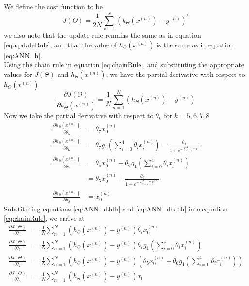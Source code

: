 \documentclass [11pt]{article}
\begin{document}
\subsection{}
We define the cost function to be
\begin{equation}\label{eq:ANN_costFunction}
J(\Theta) = \frac{1}{2N}\sum_{n=1}^{N}(h_{\Theta}(x^{(n)})-y^{(n)})^2
\end{equation}
we also note that the update rule remains the same as in equation \ref{eq:updateRule}, and that the value of $h_{\Theta}(x^{(n)})$ is the same as in equation \ref{eq:ANN_h}.
\\
Using the chain rule in equation \ref{eq:chainRule}, and substituting the appropriate values for $J(\Theta)$ and $h_{\Theta}(x^{(n)})$, we have the partial derivative with respect to $h_{\Theta}(x^{(n)})$
\begin{equation}\label{eq:ANN_dJdh}
\frac{\partial J(\Theta)}{\partial h_{\Theta}(x^{(n)})} = \frac{1}{N}\sum_{n=1}^{N}(h_{\Theta}(x^{(n)})-y^{(n)})
\end{equation}
Now we take the partial derivative with respect to $\theta_{k}$ for $k = 5,6,7,8$
\begin{equation}\label{eq:ANN_dhdth}
\begin{split}
\frac{\partial h_{\Theta}(x^{(n)})}{\partial \theta_{5}} & = \theta_{7}x_{0}^{(n)} \\
\frac{\partial h_{\Theta}(x^{(n)})}{\partial \theta_{6}} & = \theta_{7}g_{1}(\sum_{i=0}^{4}\theta_{i}x_{i}^{(n)}) = \frac{\theta_{7}}{1+e^{-\sum_{i=0}^{4}\theta_{i}x_{i}}} \\
\frac{\partial h_{\Theta}(x^{(n)})}{\partial \theta_{7}} & = \theta_{5}x_{0}^{(n)}+\theta_{6}g_{1}(\sum_{i=0}^{4}\theta_{i}x_{i}^{(n)}) \\
& = \theta_{5}x_{0}^{(n)} + \frac{\theta_{6}}{1+e^{-\sum_{i=0}^{4}\theta_{i}x_{i}^{(n)}}} \\
\frac{\partial h_{\Theta}(x^{(n)})}{\partial \theta_{8}} & = x_{0}^{(n)}
\end{split}
\end{equation}
Substituting equations \ref{eq:ANN_dJdh} and \ref{eq:ANN_dhdth} into equation \ref{eq:chainRule}, we arrive at
\begin{equation*}
\begin{split}
\frac{\partial J(\Theta)}{\partial \theta_{5}} & = \frac{1}{N}\sum_{n=1}^{N}(h_{\Theta}(x^{(n)})-y^{(n)}) \theta_{7}x_{0}^{(n)} \\
\frac{\partial J(\Theta)}{\partial \theta_{6}} & = \frac{1}{N}\sum_{n=1}^{N}(h_{\Theta}(x^{(n)})-y^{(n)})\theta_{7}g_{1}(\sum_{i=0}^{4}\theta_{i}x_{i}^{(n)}) \\
\frac{\partial J(\Theta)}{\partial \theta_{7}} & = \frac{1}{N}\sum_{n=1}^{N}(h_{\Theta}(x^{(n)})-y^{(n)})(\theta_{5}x_{0}^{(n)}+\theta_{6}g_{1}(\sum_{i=0}^{4}\theta_{i}x_{i}^{(n)})) \\
\frac{\partial J(\Theta)}{\partial \theta_{8}} & = \frac{1}{N}\sum_{n=1}^{N}(h_{\Theta}(x^{(n)})-y^{(n)})x_{0}
\end{split}
\end{equation*}
\end{document}
